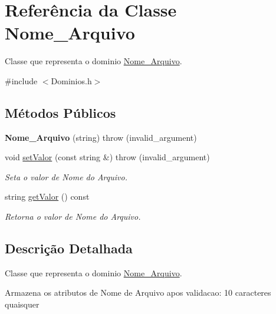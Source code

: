 \hypertarget{class_nome___arquivo}{
\section{\-Referência da \-Classe \-Nome\-\_\-\-Arquivo}
\label{class_nome___arquivo}
}


\-Classe que representa o dominio \hyperlink{class_nome___arquivo}{\-Nome\-\_\-\-Arquivo}.  




{\ttfamily \#include $<$\-Dominios.\-h$>$}

\subsection*{\-Métodos \-Públicos}
\begin{DoxyCompactItemize}
\item 
\hypertarget{class_nome___arquivo_a94184c5ebb4b36edd83f95258fa1a816}{
{\bfseries \-Nome\-\_\-\-Arquivo} (string)  throw (invalid\-\_\-argument)}
\label{class_nome___arquivo_a94184c5ebb4b36edd83f95258fa1a816}

\item 
void \hyperlink{class_nome___arquivo_a93ccb1b3f4c3458075dfa949a8d86201}{set\-Valor} (const string \&)  throw (invalid\-\_\-argument)
\begin{DoxyCompactList}\small\item\em \-Seta o valor de \-Nome do \-Arquivo. \end{DoxyCompactList}\item 
string \hyperlink{class_nome___arquivo_a265da0a7dc6a42300a7955bba9f6fcfa}{get\-Valor} () const 
\begin{DoxyCompactList}\small\item\em \-Retorna o valor de \-Nome do \-Arquivo. \end{DoxyCompactList}\end{DoxyCompactItemize}


\subsection{\-Descrição \-Detalhada}
\-Classe que representa o dominio \hyperlink{class_nome___arquivo}{\-Nome\-\_\-\-Arquivo}. 

\-Armazena os atributos de \-Nome de \-Arquivo apos validacao\-: 10 caracteres quaisquer 

